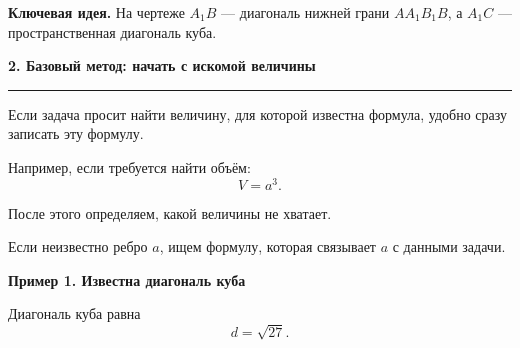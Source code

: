 \documentclass[a4paper,12pt]{article}
\newcommand{\sectiontitle}[1]{%
    \vspace{0.6em}
    {\Large\bfseries\color{darkaccent}#1}\par
    \vspace{0.25em}
    {\color{accent}\rule{\linewidth}{0.7pt}}
    \vspace{0.45em}
}
\newcommand{\subsectiontitle}[1]{%
    \vspace{0.4em}
    {\large\bfseries\color{darkaccent}#1}\par
    \vspace{0.2em}
}
\newcommand{\keyidea}[1]{%
    \par\medskip
    {\bfseries\color{darkaccent}Ключевая идея.} #1
    \par\medskip
}
\begin{document}
\begin{center}

\end{center}

\keyidea{
На чертеже \(A_1B\) --- диагональ нижней грани \(AA_1B_1B\),
а \(A_1C\) --- пространственная диагональ куба.
}

\sectiontitle{2. Базовый метод: начать с искомой величины}

Если задача просит найти величину, для которой известна формула,
удобно сразу записать эту формулу.

Например, если требуется найти объём:
\[
\boxed{V=a^3}.
\]

После этого определяем, какой величины не хватает.

Если неизвестно ребро \(a\), ищем формулу,
которая связывает \(a\) с данными задачи.

\subsectiontitle{Пример 1. Известна диагональ куба}

Диагональ куба равна
\[
d=\sqrt{27}.
\]
\end{document}
